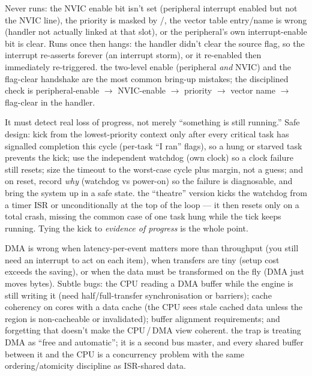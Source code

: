 Never runs: the NVIC enable bit isn't set (peripheral interrupt enabled but not
the NVIC line), the priority is masked by /, the
vector table entry/name is wrong (handler not actually linked at that slot), or
the peripheral's own interrupt-enable bit is clear. Runs once then hangs: the
handler didn't clear the source flag, so the interrupt re-asserts forever (an
interrupt storm), or it re-enabled then immediately re-triggered. \trap the
two-level enable (peripheral \emph{and} NVIC) and the flag-clear handshake are
the most common bring-up mistakes; the disciplined check is peripheral-enable
$\rightarrow$ NVIC-enable $\rightarrow$ priority $\rightarrow$ vector name
$\rightarrow$ flag-clear in the handler.

It must detect real loss of progress, not merely ``something is still running.''
Safe design: kick from the lowest-priority context only after every critical
task has signalled completion this cycle (per-task ``I ran'' flags), so a hung
or starved task prevents the kick; use the independent watchdog (own clock) so a
clock failure still resets; size the timeout to the worst-case cycle plus
margin, not a guess; and on reset, record \emph{why} (watchdog vs power-on) so
the failure is diagnosable, and bring the system up in a safe state. \trap the
``theatre'' version kicks the watchdog from a timer ISR or unconditionally at
the top of the loop --- it then resets only on a total crash, missing the
common case of one task hung while the tick keeps running. Tying the kick to
\emph{evidence of progress} is the whole point.

DMA is wrong when latency-per-event matters more than throughput (you still need
an interrupt to act on each item), when transfers are tiny (setup cost exceeds
the saving), or when the data must be transformed on the fly (DMA just moves
bytes). Subtle bugs: the CPU reading a DMA buffer while the engine is still
writing it (need half/full-transfer synchronisation or barriers); cache
coherency on cores with a data cache (the CPU sees stale cached data unless the
region is non-cacheable or invalidated); buffer alignment requirements; and
forgetting that  doesn't make the CPU\,/\,DMA view coherent.
\trap the trap is treating DMA as ``free and automatic''; it is a second bus
master, and every shared buffer between it and the CPU is a concurrency problem
with the same ordering/atomicity discipline as ISR-shared data.

